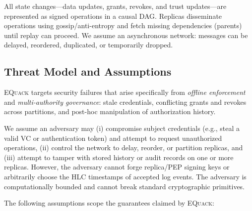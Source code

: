 \documentclass[10pt,journal,compsoc]{IEEEtran}
\newcommand{\equack}{\textsc{EQuack}}
\begin{document}
All state changes---data updates, grants, revokes, and trust updates---are represented as signed operations in a causal DAG. Replicas disseminate operations using gossip/anti-entropy and fetch missing dependencies (parents) until replay can proceed. We assume an asynchronous network: messages can be delayed, reordered, duplicated, or temporarily dropped.

\subsection{Threat Model and Assumptions}\label{subsec:threat-model-paperC}

\equack{} targets security failures that arise specifically from \emph{offline enforcement} and \emph{multi-authority governance}: stale credentials, conflicting grants and revokes across partitions, and post-hoc manipulation of authorization history.

We assume an adversary may (i) compromise subject credentials (e.g., steal a valid VC or authentication token) and attempt to request unauthorized operations, (ii) control the network to delay, reorder, or partition replicas, and (iii) attempt to tamper with stored history or audit records on one or more replicas. However, the adversary cannot forge replica/PEP signing keys or arbitrarily choose the HLC timestamps of accepted log events. The adversary is computationally bounded and cannot break standard cryptographic primitives.

The following assumptions scope the guarantees claimed by \equack{}:
\end{document}
